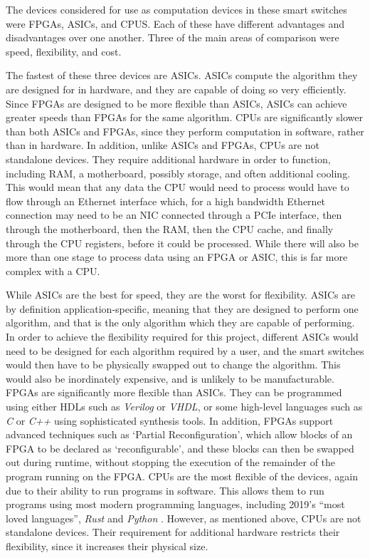 The devices considered for use as computation devices in these smart switches were FPGAs, ASICs, and CPUS. Each of these have different advantages and disadvantages over one another. Three of the main areas of comparison were speed, flexibility, and cost.

The fastest of these three devices are ASICs. ASICs compute the algorithm they are designed for in hardware, and they are capable of doing so very efficiently.
Since FPGAs are designed to be more flexible than ASICs, ASICs can achieve greater speeds than FPGAs for the same algorithm.
CPUs are significantly slower than both ASICs and FPGAs, since they perform computation in software, rather than in hardware. In addition, unlike ASICs and FPGAs, CPUs are not standalone devices. They require additional hardware in order to function, including RAM, a motherboard, possibly storage, and often additional cooling. This would mean that any data the CPU would need to process would have to flow through an Ethernet interface which, for a high bandwidth Ethernet connection may need to be an NIC connected through a PCIe interface, then through the motherboard, then the RAM, then the CPU cache, and finally through the CPU registers, before it could be processed. While there will also be more than one stage to process data using an FPGA or ASIC, this is far more complex with a CPU.

While ASICs are the best for speed, they are the worst for flexibility. ASICs are by definition application-specific, meaning that they are designed to perform one algorithm, and that is the only algorithm which they are capable of performing. In order to achieve the flexibility required for this project, different ASICs would need to be designed for each algorithm required by a user, and the smart switches would then have to be physically swapped out to change the algorithm. This would also be inordinately expensive, and is unlikely to be manufacturable.
FPGAs are significantly more flexible than ASICs. They can be programmed using either HDLs such as \textit{Verilog} or \textit{VHDL}, or some high-level languages such as \textit{C} or \textit{C++} using sophisticated synthesis tools. In addition, FPGAs support advanced techniques such as `Partial Reconfiguration', which allow blocks of an FPGA to be declared as `reconfigurable', and these blocks can then be swapped out during runtime, without stopping the execution of the remainder of the program running on the FPGA.
CPUs are the most flexible of the devices, again due to their ability to run programs in software. This allows them to run programs using most modern programming languages, including 2019's ``most loved languages'', \textit{Rust} and \textit{Python} \cite{stack_overflow_dev_survey_2019}.
However, as mentioned above, CPUs are not standalone devices. Their requirement for additional hardware restricts their flexibility, since it increases their physical size.

